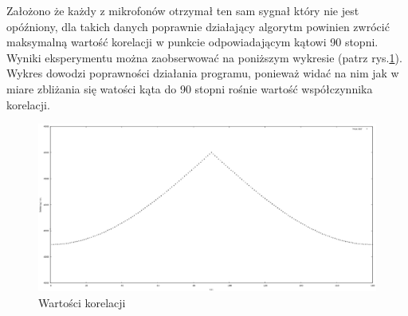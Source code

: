 \documentclass[eng,printmode]{mgr}
\begin{document}
Założono że każdy z mikrofonów otrzymał ten sam sygnał który nie jest opóźniony, dla takich danych poprawnie działający algorytm powinien zwrócić maksymalną wartość korelacji w punkcie odpowiadającym kątowi 90 stopni. Wyniki eksperymentu można zaobserwować na poniższym wykresie
(patrz rys.\ref{fig-suma}). Wykres dowodzi poprawności działania programu, ponieważ widać na nim jak w miare zbliżania się watości kąta do 90 stopni rośnie wartość współczynnika korelacji.

\begin{figure}[ht]

    \centering

  \includegraphics[width=1.1\textwidth, angle=0]{suma.png}

    \caption{Wartości korelacji}
 \label{fig-suma}
    

\end{figure}





\end{document}
